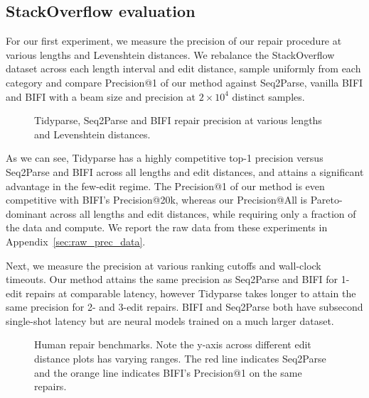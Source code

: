 \documentclass[runningheads]{llncs}
\begin{document}
  \clearpage\subsection{StackOverflow evaluation}\label{sec:rq2}

  For our first experiment, we measure the precision of our repair procedure at various lengths and Levenshtein distances. We rebalance the StackOverflow dataset across each length interval and edit distance, sample uniformly from each category and compare Precision@1 of our method against Seq2Parse, vanilla BIFI and BIFI with a beam size and precision at $2\times10^4$ distinct samples.

  \begin{figure}[h!]
    \resizebox{.24\textwidth}{!}{}
    \resizebox{.24\textwidth}{!}{}
    \resizebox{.24\textwidth}{!}{}
    \resizebox{.24\textwidth}{!}{}
    \caption{Tidyparse, Seq2Parse and BIFI repair precision at various lengths and Levenshtein distances.}\label{fig:len_dist_prec}
  \end{figure}

  As we can see, Tidyparse has a highly competitive top-1 precision versus Seq2Parse and BIFI across all lengths and edit distances, and attains a significant advantage in the few-edit regime. The Precision@1 of our method is even competitive with BIFI's Precision@20k, whereas our Precision@All is Pareto-dominant across all lengths and edit distances, while requiring only a fraction of the data and compute. We report the raw data from these experiments in Appendix~\ref{sec:raw_prec_data}.

  Next, we measure the precision at various ranking cutoffs and wall-clock timeouts. Our method attains the same precision as Seq2Parse and BIFI for 1-edit repairs at comparable latency, however Tidyparse takes longer to attain the same precision for 2- and 3-edit repairs. BIFI and Seq2Parse both have subsecond single-shot latency but are neural models trained on a much larger dataset.

  \begin{figure}[h!]
    \resizebox{.24\textwidth}{!}{}
    \resizebox{.24\textwidth}{!}{}
    \resizebox{.24\textwidth}{!}{}
    \resizebox{.24\textwidth}{!}{}
    \caption{Human repair benchmarks. Note the y-axis across different edit distance plots has varying ranges. The red line indicates Seq2Parse and the orange line indicates BIFI's Precision@1 on the same repairs.}\label{fig:human}
  \end{figure}
\end{document}

